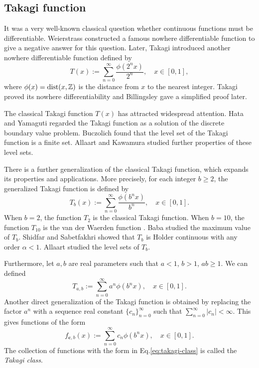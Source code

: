 \documentclass{amsart}
\theoremstyle{definition}
\theoremstyle{remark}
\numberwithin{equation}{section}
\def\bfc{\mathbf{c}}
\newcommand{\dist}{{\rm dist}}
\begin{document}
\subsection{Takagi function}
It was a very well-known classical question whether continuous functions must be differentiable. Weierstrass \cite{W1872} constructed a famous nowhere differentiable function to give a negative answer for this question. Later, Takagi \cite{T1903} introduced another nowhere differentiable function defined by
$$T(x):=\sum_{n=0}^{\infty} \frac{\phi(2^n x)}{2^n}, \quad x \in [0,1],$$
where $\phi(x)=\dist(x,\mathbb{Z})$ is the distance from $x$ to the nearest integer.  Takagi \cite{T1903} proved its nowhere differentiability and Billingsley \cite{B82} gave a simplified proof later. 

The classical Takagi function $T(x)$ has attracted widespread attention. Hata and Yamaguti \cite{HY84} regarded the Takagi function as a solution of the discrete boundary value problem. Buczolich \cite{B08} found that the level set of the Takagi function is a finite set. Allaart and Kawamura \cite{AK11} studied further properties of these level sets.

There is a further generalization of the classical Takagi function, which expands its properties and applications. More precisely, for each integer $b\geq2$, the generalized Takagi function is defined by
$$
T_b(x):=\sum_{n=0}^\infty\frac{\phi(b^n x)}{b^n}, \quad x\in [0,1].
$$
When $b=2$, the function $T_2$ is the classical Takagi function. When $b=10$, the function $T_{10}$ is the van der Waerden function \cite{V30}. Baba \cite{B84} studied the maximum value of $T_b$. 
Shidfar and Sabetfakhri \cite{SS86} showed that $T_b$ is H$\ddot{\mbox{o}}$lder continuous with any order $\alpha<1$.
Allaart \cite{A14} studied the level sets of $T_b$.


{
Furthermore, let $a,b$ are real parameters such that $a<1$, $b>1$, $ab \geq 1$.
We can defined 
\begin{equation}
	T_{a,b}:=\sum_{n=0}^\infty a^n \phi(b^n x),  \quad x\in [0,1].
\end{equation}
}
Another direct generalization of the Takagi function is obtained by replacing
the factor $a^n$ with a sequence real constant $\{c_n\}_{n=0}^\infty$ such that $\sum_{n=0}^\infty |c_n|<\infty$. 
This gives functions of the form
\begin{equation}\label{eq:takagi-class}
	f_{\bfc,b}(x) := \sum_{n=0}^\infty c_n \phi(b^nx),\quad x\in [0,1] .	
\end{equation}
The collection of functions with the form in Eq.\eqref{eq:takagi-class} is called the \emph{Takagi class}.
\end{document}
